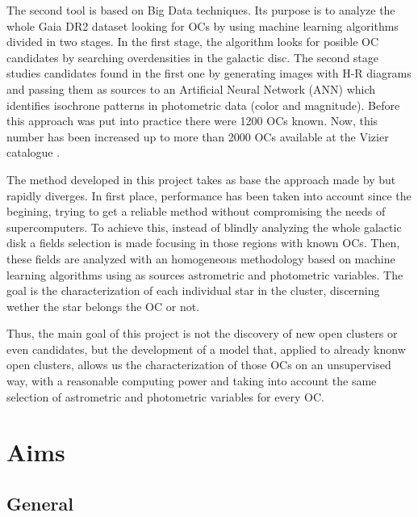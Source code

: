 \documentclass[11pt, a4paper, english]{book}
\begin{document}
The second tool is based on Big Data techniques. Its purpose is to analyze the whole Gaia DR2 dataset looking for OCs by using
machine learning algorithms divided in two stages. In the first stage, the algorithm looks for posible OC candidates by searching
overdensities in the galactic disc.
The second stage studies candidates found in the first one by generating images with H-R diagrams and passing them
as sources to an Artificial Neural Network (ANN) which identifies isochrone patterns in photometric data (color and magnitude).
Before this approach was put into practice there were 1200 OCs known. Now, this number has been increased up to more than 2000 OCs
available at the Vizier catalogue \cite{ochsenbein2000vizier}.

The method developed in this project takes as base the approach made by \citeauthor{castro2020hunting} but rapidly diverges.
In first place, performance has been taken into account since the begining, trying to get a reliable method without compromising the
needs of supercomputers.
To achieve this, instead of blindly analyzing the whole galactic disk a fields selection is made focusing in those regions with known OCs.
Then, these fields are analyzed with an homogeneous methodology based on machine learning algorithms using as sources astrometric and
photometric variables. The goal is the characterization of each individual star in the cluster, discerning wether the star belongs the OC
or not.

Thus, the main goal of this project is not the discovery of new open clusters or even candidates, but the development of a model that,
applied to already knonw open clusters, allows us the characterization of those OCs on an unsupervised way, with a reasonable computing
power and taking into account the same selection of astrometric and photometric variables for every OC.



\chapter{Aims}

\section{General}
\end{document}
